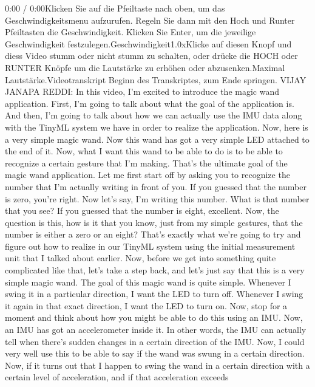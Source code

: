     0:00 / 0:00Klicken Sie auf die Pfeiltaste nach oben, um das Geschwindigkeitsmenu aufzurufen. Regeln Sie dann mit den Hoch und Runter Pfeiltasten die Geschwindigkeit. Klicken Sie Enter, um die jeweilige Geschwindigkeit festzulegen.Geschwindigkeit1.0xKlicke auf diesen Knopf und diess Video stumm oder nicht stumm zu schalten, oder drücke die HOCH oder RUNTER Knöpfe um die Lautstärke zu erhöhen oder abzusenken.Maximal Lautstärke.Videotranskript
    Beginn des Transkriptes, zum Ende springen.
    VIJAY JANAPA REDDI: In this video, I'm excited to introduce
    the magic wand application.
    First, I'm going to talk about what the goal of the application is.
    And then, I'm going to talk about how we can actually use the IMU data along
    with the TinyML system we have in order to realize the application.
    Now, here is a very simple magic wand.
    Now this wand has got a very simple LED attached to the end of it.
    Now, what I want this wand to be able to do
    is to be able to recognize a certain gesture that I'm making.
    That's the ultimate goal of the magic wand application.
    Let me first start off by asking you to recognize the number that I'm actually
    writing in front of you.
    If you guessed that the number is zero, you're right.
    Now let's say, I'm writing this number.
    What is that number that you see?
    If you guessed that the number is eight, excellent.
    Now, the question is this, how is it that you know, just
    from my simple gestures, that the number is either a zero or an eight?
    That's exactly what we're going to try and figure out
    how to realize in our TinyML system using the initial measurement
    unit that I talked about earlier.
    Now, before we get into something quite complicated like that,
    let's take a step back, and let's just say
    that this is a very simple magic wand.
    The goal of this magic wand is quite simple.
    Whenever I swing it in a particular direction, I want the LED to turn off.
    Whenever I swing it again in that exact direction, I want the LED to turn on.
    Now, stop for a moment and think about how you
    might be able to do this using an IMU.
    Now, an IMU has got an accelerometer inside it.
    In other words, the IMU can actually tell
    when there's sudden changes in a certain direction of the IMU.
    Now, I could very well use this to be able to say if the wand was
    swung in a certain direction.
    Now, if it turns out that I happen to swing the wand in a certain direction
    with a certain level of acceleration, and if that acceleration exceeds
